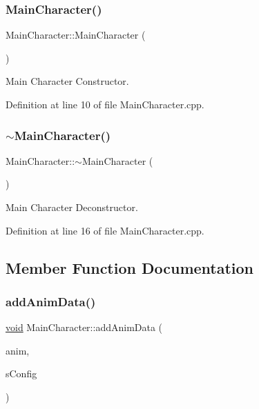 \subsubsection{\texorpdfstring{MainCharacter()}{MainCharacter()}}
{\footnotesize\ttfamily Main\+Character\+::\+Main\+Character (\begin{DoxyParamCaption}{ }\end{DoxyParamCaption})}



Main Character Constructor. 



Definition at line 10 of file Main\+Character.\+cpp.

\mbox{\label{class_main_character_a6d7d97ce443fa977a798ea1c956b0fc1}} 
\subsubsection{\texorpdfstring{$\sim$MainCharacter()}{~MainCharacter()}}
{\footnotesize\ttfamily Main\+Character\+::$\sim$\+Main\+Character (\begin{DoxyParamCaption}{ }\end{DoxyParamCaption})}



Main Character Deconstructor. 



Definition at line 16 of file Main\+Character.\+cpp.



\subsection{Member Function Documentation}
\mbox{\label{class_main_character_a8695871c895e5c13d814d397cc61dfa3}} 
\subsubsection{\texorpdfstring{addAnimData()}{addAnimData()}}
{\footnotesize\ttfamily \mbox{\hyperlink{_s_d_l__opengles2__gl2ext_8h_ae5d8fa23ad07c48bb609509eae494c95}{void}} Main\+Character\+::add\+Anim\+Data (\begin{DoxyParamCaption}\item[{int}]{anim,  }\item[{\mbox{\hyperlink{struct_sprite_config}{Sprite\+Config}}}]{s\+Config }\end{DoxyParamCaption})}



